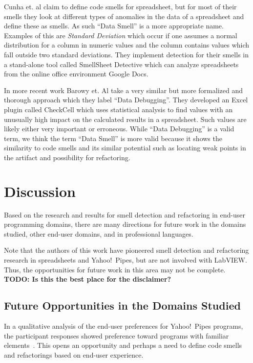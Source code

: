 \documentclass[10pt,conference,compsocconf]{IEEEtran}
\newcommand{\todo}[1]{\textbf{TODO: #1}}
\begin{document}
Cunha et. al \cite{cunha2012towards} claim to define code smells for spreadsheet, but for most of their smells they look at different types of anomalies in the data of a spreadsheet and define these as smells.
As such ``Data Smell'' is a more appropriate name.
Examples of this are \textit{Standard Deviation} which occur if one assumes a normal distribution for a column in numeric values and the column contains values which fall outside two standard deviations.
They implement detection for their smells in a stand-alone tool called SmellSheet Detective which can analyze spreadsheets from the online office environment Google Docs.

In more recent work Barowy et. Al \cite{barowy2014checkcell} take a very similar but more formalized and thorough approach which they label ``Data Debugging''.
They developed an Excel plugin called CheckCell which uses statistical analysis to find values with an unusually high impact on the calculated results in a spreadsheet.
Such values are likely either very important or erroneous.
While ``Data Debugging'' is a valid term, we think the term ``Data Smell'' is more valid because it shows the similarity to code smells and its similar potential such as locating weak points in the artifact and possibility for refactoring.

\section{Discussion}
\label{sec:discussion}

Based on the research and results for smell detection and refactoring in end-user programming domains, there are many directions for future work in the domains studied, other end-user domains, and in professional languages. 

Note that the authors of this work have pioneered smell detection and refactoring research in spreadsheets and Yahoo!\ Pipes, but are not involved with LabVIEW. Thus, the opportunities for future work in this area may not be complete.  \todo{Is this the best place for the disclaimer?}




\subsection{Future Opportunities in the Domains Studied}
In a qualitative analysis of the end-user preferences for Yahoo!\ Pipes programs, the participant responses showed preference toward programs with familiar elements~\cite{Stolee2015}. This opens an opportunity and perhaps a need to define code smells and refactorings based on end-user experience. 
\end{document}

